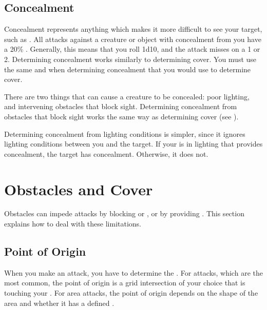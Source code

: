   \subsection{Concealment}\label{Concealment}
    Concealment represents anything which makes it more difficult to see your target, such as .
    All  attacks against a creature or object with concealment from you have a 20\% .
    Generally, this means that you roll 1d10, and the attack misses on a 1 or 2.
    Determining concealment works similarly to determining cover.
    You must use the same  and  when determining concealment that you would use to determine cover.

     There are two things that can cause a creature to be concealed: poor lighting, and intervening obstacles that block sight.
    Determining concealment from obstacles that block sight works the same way as determining cover (see ).

    Determining concealment from lighting conditions is simpler, since it ignores lighting conditions between you and the target.
    If your  is in lighting that provides concealment, the target has concealment.
    Otherwise, it does not.

\section{Obstacles and Cover}\label{Obstacles and Cover}
  Obstacles can impede attacks by blocking  or , or by providing .
  This section explains how to deal with these limitations.

  \subsection{Point of Origin}\label{Point of Origin}
    When you make an attack, you have to determine the .
    For  attacks, which are the most common, the point of origin is a grid intersection of your choice that is touching your .
    For area attacks, the point of origin depends on the shape of the area and whether it has a defined .

